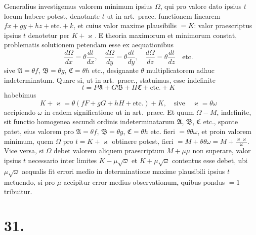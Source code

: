 \documentclass[12pt,a4paper]{book}
\begin{document}
Generalius investigemus valorem minimum ipsius $\Omega$, qui pro valore dato ipsius $t$ locum habere potest, denotante $t$ ut in art.~praec. functionem linearem $fx+gy+hz+\text{etc.}+k$, et cuius valor maxime plausibilis $=K$: valor praescriptus ipsius $t$ denotetur per $K+\varkappa$. E theoria maximorum et minimorum constat, problematis solutionem petendam esse ex aequationibus
%
\begin{equation*}
\frac{d\Omega}{dx}=\theta\frac{dt}{dx},\quad\frac{d\Omega}{dy}=\theta\frac{dt}{dy},\quad\frac{d\Omega}{dz}=\theta\frac{dt}{dz}\quad\text{etc.}
\end{equation*}
sive $\mathfrak{A}=\theta f$, $\mathfrak{B}=\theta g$, $\mathfrak{C}=\theta h$ etc., designante $\theta$ multiplicatorem adhuc indeterminatum. Quare si, ut in art.~praec., statuimus, esse indefinite
%
\begin{equation*}
t=F\mathfrak{A}+G\mathfrak{B}+H\mathfrak{C}+\text{etc.}+K
\end{equation*}
habebimus
%
\begin{equation*}
K+\varkappa=\theta(fF+gG+hH+\text{etc.})+K,\quad\text{sive}\quad\varkappa=\theta\omega
\end{equation*}
accipiendo $\omega$ in eadem significatione ut in art.~praec. Et quum $\Omega-M$, indefinite, sit functio homogenea secundi ordinis indeterminatarum $\mathfrak{A}$, $\mathfrak{B}$, $\mathfrak{C}$ etc., sponte patet, eius valorem pro $\mathfrak{A}=\theta f$, $\mathfrak{B}=\theta g$, $\mathfrak{C}=\theta h$ etc. fieri $=\theta\theta\omega$, et proin valorem minimum, quem $\Omega$ pro $t=K+\varkappa$ obtinere potest, fieri $=M+\theta\theta\omega=M+\frac{\varkappa\varkappa}{\omega}$. Vice versa, si $\Omega$ debet valorem aliquem praescriptum $M+\mu\mu$ non superare, valor ipsius $t$ necessario inter limites $K-\mu\surd\omega$ et $K+\mu\surd\omega$ contentus esse debet, ubi $\mu\surd\omega$ aequalis fit errori medio in determinatione maxime plausibili ipsius $t$ metuendo, si pro $\mu$ accipitur error medius observationum, quibus pondus $=1$ tribuitur.

\section*{31.}
\label{sec:art31}
\end{document}
